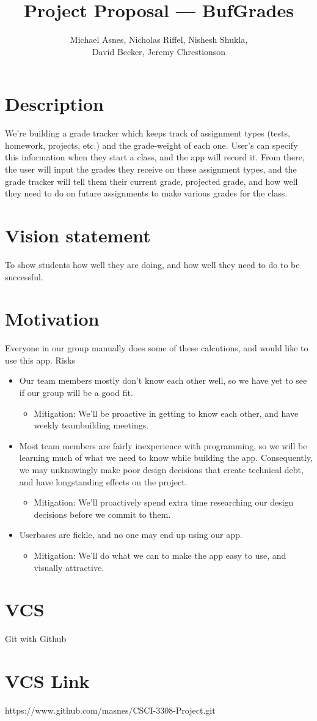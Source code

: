 \documentclass{article}
\begin{document}
\title{Project Proposal --- BufGrades}
\author{Michael Asnes, Nicholas Riffel, Nishesh Shukla, \\ David Becker, Jeremy Chrestionson}

\maketitle
\section{Description}
We're building a grade tracker which keeps track of assignment types (tests, homework, projects, etc.) and the grade-weight of each one. User's can specify this information when they start a class, and the app will record it. From there, the user will input the grades they receive on these assignment types, and the grade tracker will tell them their current grade, projected grade, and how well they need to do on future assignments to make various grades for the class.
\section{Vision statement}
To show students how well they are doing, and how well they need to do to be successful.
\section{Motivation} 
Everyone in our group manually does some of these calcutions, and would like to use this app.
{Risks}
\begin{itemize}
  \item Our team members mostly don't know each other well, so we have yet to see if our group will be a good fit.
    \begin{itemize}
      \item Mitigation: We'll be proactive in getting to know each other, and have weekly teambuilding meetings.
    \end{itemize}
  \item Most team members are fairly inexperience with programming, so we will be learning much of what we need to know while building the app. Consequently, we may unknowingly make poor design decisions that create technical debt, and have longstanding effects on the project.
    \begin{itemize}
      \item Mitigation: We'll proactively spend extra time researching our design decisions before we commit to them.
    \end{itemize}
  \item Userbases are fickle, and no one may end up using our app.
    \begin{itemize}
      \item Mitigation: We'll do what we can to make the app easy to use, and visually attractive.
    \end{itemize}
\end{itemize}
\section{VCS}
Git with Github
\section{VCS Link}
https://www.github.com/masnes/CSCI-3308-Project.git
\end{document}
